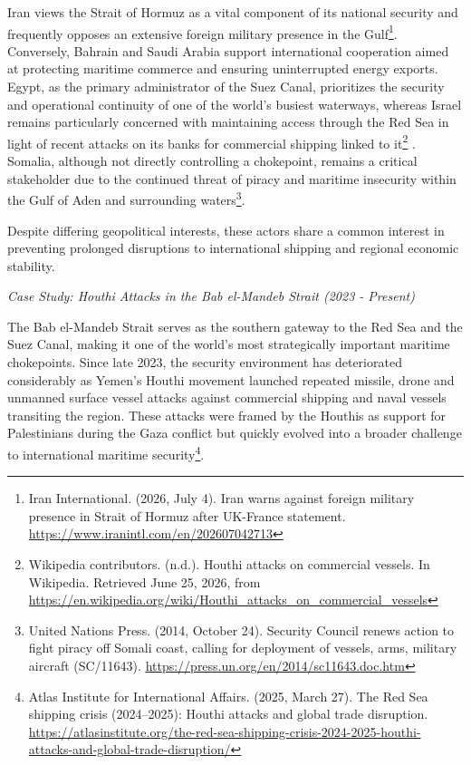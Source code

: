 Iran views the Strait of Hormuz as a vital component of its national security and frequently opposes an extensive foreign military presence in the Gulf\footnote{Iran International. (2026, July 4). Iran warns against foreign military presence in Strait of Hormuz after UK-France statement. \url{https://www.iranintl.com/en/202607042713}}. Conversely, Bahrain and Saudi Arabia support international cooperation aimed at protecting maritime commerce and ensuring uninterrupted energy exports. Egypt, as the primary administrator of the Suez Canal, prioritizes the security and operational continuity of one of the world's busiest waterways, whereas Israel remains particularly concerned with maintaining access through the Red Sea in light of recent attacks on its banks for commercial shipping linked to it\footnote{Wikipedia contributors. (n.d.). Houthi attacks on commercial vessels. In Wikipedia. Retrieved June 25, 2026, from \url{https://en.wikipedia.org/wiki/Houthi_attacks_on_commercial_vessels}} . Somalia, although not directly controlling a chokepoint, remains a critical stakeholder due to the continued threat of piracy and maritime insecurity within the Gulf of Aden and surrounding waters\footnote{United Nations Press. (2014, October 24). Security Council renews action to fight piracy off Somali coast, calling for deployment of vessels, arms, military aircraft (SC/11643). \url{https://press.un.org/en/2014/sc11643.doc.htm}}.

Despite differing geopolitical interests, these actors share a common interest in preventing prolonged disruptions to international shipping and regional economic stability.

\emph{Case Study: Houthi Attacks in the Bab el-Mandeb Strait (2023 - Present)}

The Bab el-Mandeb Strait serves as the southern gateway to the Red Sea and the Suez Canal, making it one of the world's most strategically important maritime chokepoints. Since late 2023, the security environment has deteriorated considerably as Yemen's Houthi movement launched repeated missile, drone and unmanned surface vessel attacks against commercial shipping and naval vessels transiting the region. These attacks were framed by the Houthis as support for Palestinians during the Gaza conflict but quickly evolved into a broader challenge to international maritime security\footnote{Atlas Institute for International Affairs. (2025, March 27). The Red Sea shipping crisis (2024–2025): Houthi attacks and global trade disruption. \url{https://atlasinstitute.org/the-red-sea-shipping-crisis-2024-2025-houthi-attacks-and-global-trade-disruption/}}.


